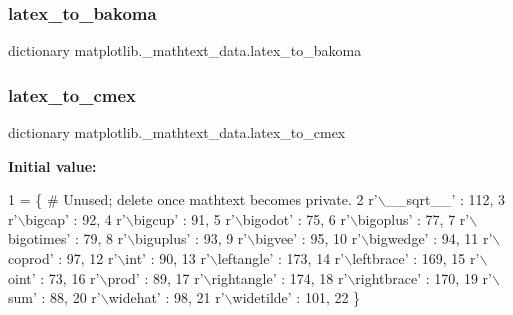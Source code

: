 \subsubsection{\texorpdfstring{latex\+\_\+to\+\_\+bakoma}{latex\_to\_bakoma}}
{\footnotesize\ttfamily dictionary matplotlib.\+\_\+mathtext\+\_\+data.\+latex\+\_\+to\+\_\+bakoma}

\mbox{\label{namespacematplotlib_1_1__mathtext__data_a993f6ae0d26ec3770138abd7ecc7df62}} 
\subsubsection{\texorpdfstring{latex\+\_\+to\+\_\+cmex}{latex\_to\_cmex}}
{\footnotesize\ttfamily dictionary matplotlib.\+\_\+mathtext\+\_\+data.\+latex\+\_\+to\+\_\+cmex}

{\bfseries Initial value\+:}
\begin{DoxyCode}
1 =  \{  \textcolor{comment}{# Unused; delete once mathtext becomes private.}
2     \textcolor{stringliteral}{r'\(\backslash\)\_\_sqrt\_\_'}   : 112,
3     \textcolor{stringliteral}{r'\(\backslash\)bigcap'}     : 92,
4     \textcolor{stringliteral}{r'\(\backslash\)bigcup'}     : 91,
5     \textcolor{stringliteral}{r'\(\backslash\)bigodot'}    : 75,
6     \textcolor{stringliteral}{r'\(\backslash\)bigoplus'}   : 77,
7     \textcolor{stringliteral}{r'\(\backslash\)bigotimes'}  : 79,
8     \textcolor{stringliteral}{r'\(\backslash\)biguplus'}   : 93,
9     \textcolor{stringliteral}{r'\(\backslash\)bigvee'}     : 95,
10     \textcolor{stringliteral}{r'\(\backslash\)bigwedge'}   : 94,
11     \textcolor{stringliteral}{r'\(\backslash\)coprod'}     : 97,
12     \textcolor{stringliteral}{r'\(\backslash\)int'}        : 90,
13     \textcolor{stringliteral}{r'\(\backslash\)leftangle'}  : 173,
14     \textcolor{stringliteral}{r'\(\backslash\)leftbrace'}  : 169,
15     \textcolor{stringliteral}{r'\(\backslash\)oint'}       : 73,
16     \textcolor{stringliteral}{r'\(\backslash\)prod'}       : 89,
17     \textcolor{stringliteral}{r'\(\backslash\)rightangle'} : 174,
18     \textcolor{stringliteral}{r'\(\backslash\)rightbrace'} : 170,
19     \textcolor{stringliteral}{r'\(\backslash\)sum'}        : 88,
20     \textcolor{stringliteral}{r'\(\backslash\)widehat'}    : 98,
21     \textcolor{stringliteral}{r'\(\backslash\)widetilde'}  : 101,
22 \}
\end{DoxyCode}
\mbox{\label{namespacematplotlib_1_1__mathtext__data_af4354164cdbc803e3a53e5d3797e0dea}} 

